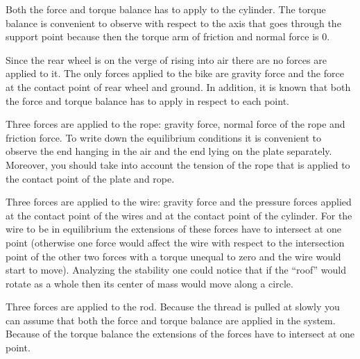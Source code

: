 \documentclass[11pt]{article}
\begin{document}
\hinteng
Both the force and torque balance has to apply to the cylinder. The torque balance is convenient to observe with respect to the axis that goes through the support point because then the torque arm of friction and normal force is 0.
\probend
\bigskip


\hinteng
Since the rear wheel is on the verge of rising into air there are no forces are applied to it. The only forces applied to the bike are gravity force and the force at the contact point of rear wheel and ground. In addition, it is known that both the force and torque balance has to apply in respect to each point.
\probend
\bigskip


\hinteng
Three forces are applied to the rope: gravity force, normal force of the rope and friction force. To write down the equilibrium conditions it is convenient to observe the end hanging in the air and the end lying on the plate separately.  Moreover, you should take into account the tension of the rope that is applied to the contact point of the plate and rope.
\probend
\bigskip


\hinteng
Three forces are applied to the wire: gravity force and the pressure forces applied at the contact point of the wires and at the contact point of the cylinder. For the wire to be in equilibrium the extensions of these forces have to intersect at one point (otherwise one force would affect the wire with respect to the intersection point of the other two forces with a torque unequal to zero and the wire would start to move). Analyzing the stability one could notice that if the “roof” would rotate as a whole then its center of mass would move along a circle.
\probend
\bigskip


\hinteng
Three forces are applied to the rod. Because the thread is pulled at slowly you can assume that both the force and torque balance are applied in the system. Because of the torque balance the extensions of the forces have to intersect at one point.
\probend
\bigskip
\end{document}
